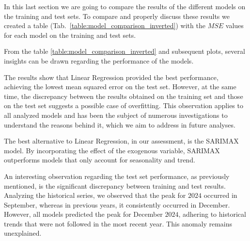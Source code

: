 \documentclass[10pt,twocolumn,letterpaper]{article}
\begin{document}
In this last section we are going to compare the results of the different models on the training and test sets. To compare and properly discuss these results we created a table (Tab.~\ref{table:model_comparison_inverted}) with the $MSE$ values for each model on the training and test sets.%

\begin{table}[H]
\centering
{}
\caption{Performance metrics for different models (MSE)}
\label{table:model_comparison_inverted}
\end{table}

From the table \ref{table:model_comparison_inverted} and subsequent plots, several insights can be drawn regarding the performance of the models.

The results show that Linear Regression provided the best performance, achieving the lowest mean squared error on the test set. However, at the same time, the discrepancy between the results obtained on the training set and those on the test set suggests a possible case of overfitting. This observation applies to all analyzed models and has been the subject of numerous investigations to understand the reasons behind it, which we aim to address in future analyses. %

The best alternative to Linear Regression, in our assessment, is the SARIMAX model. By incorporating the effect of the exogenous variable, SARIMAX outperforms models that only account for seasonality and trend.

An interesting observation regarding the test set performance, as previously mentioned, is the significant discrepancy between training and test results. Analyzing the historical series, we observed that the peak for $2024$ occurred in September, whereas in previous years, it consistently occurred in December. However, all models predicted the peak for December $2024$, adhering to historical trends that were not followed in the most recent year. This anomaly remains unexplained.
\end{document}
